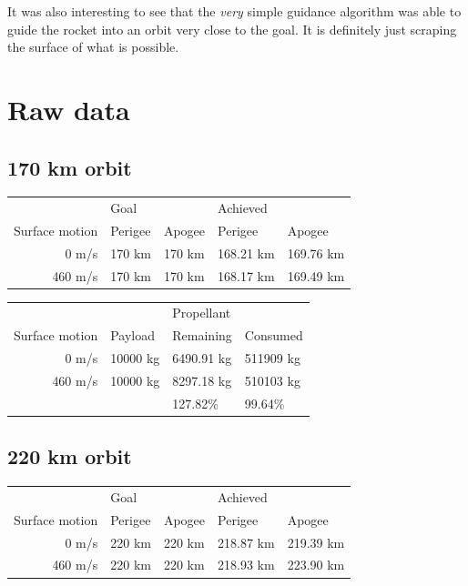 \documentclass[11pt]{article}
\begin{document}
It was also interesting to see that the \textit{very} simple guidance algorithm was able to guide the rocket into an orbit very close to the goal.
It is definitely just scraping the surface of what is possible.

\newpage

\appendix

\section{Raw data}
\subsection{170 km orbit}
\begin{center}
  \begin{tabular}{ r | l   l | l   l }
     & Goal  &  & Achieved &  \\
    Surface motion & Perigee & Apogee & Perigee & Apogee \\
    \hline
    0 m/s & 170 km & 170 km & 168.21 km & 169.76 km \\
    460 m/s & 170 km & 170 km & 168.17 km & 169.49 km
  \end{tabular}
\end{center}

\begin{center}
  \begin{tabular}{ r   l   l l }
     &  & Propellant &  \\
    Surface motion & Payload & Remaining & Consumed \\
    \hline
    0 m/s & 10000 kg & 6490.91 kg  & 511909 kg \\
    460 m/s & 10000 kg & 8297.18 kg  & 510103 kg \\
    \hline
      &   & 127.82\%  & 99.64\% \\
  \end{tabular}
\end{center}

\subsection{220 km orbit}
\begin{center}
  \begin{tabular}{ r | l   l | l   l }
     & Goal  &  & Achieved &  \\
    Surface motion & Perigee & Apogee & Perigee & Apogee \\
    \hline
    0 m/s & 220 km & 220 km & 218.87 km & 219.39 km \\
    460 m/s & 220 km & 220 km & 218.93 km & 223.90 km
  \end{tabular}
\end{center}
\end{document}
